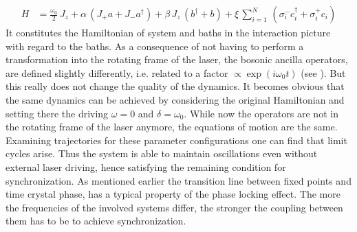 \begin{align*}
    H &= \frac{\omega_0}{2}\,J_z +\alpha\,(J_+a + J_-a^\dagger)+ \beta\,J_z\,(b^\dagger+b)+\xi\,\sum_{i=1}^N\,(\sigma_i^-c_i^\dagger+\sigma_i^+c_i)
\end{align*}
It constitutes the Hamiltonian of system and baths in the interaction picture with regard to the baths. As a consequence of not having to perform a transformation into the rotating frame of the laser, the bosonic ancilla operators, are defined slightly differently, i.e. related to a factor $\propto\exp(i\omega_0t)$ (see ). But this really does not change the quality of the dynamics. It becomes obvious that the same dynamics can be achieved by considering the original Hamiltonian and setting there the driving $\omega=0$ and $\delta=\omega_0$. While now the operators are not in the rotating frame of the laser anymore, the equations of motion are the same. Examining trajectories for these parameter configurations one can find that limit cycles arise. Thus the system is able to maintain oscillations even without external laser driving, hence satisfying the remaining condition for synchronization. As mentioned earlier the transition line between fixed points and time crystal phase, has a typical property of the phase locking effect. The more the frequencies of the involved systems differ, the stronger the coupling between them has to be to achieve synchronization. 
